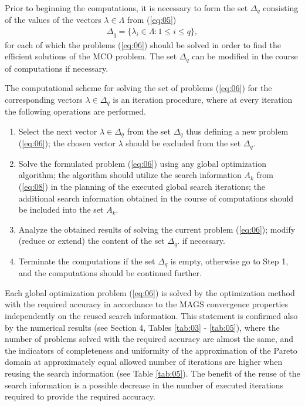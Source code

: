 \documentclass[smallcondensed]{svjour3}     %
\begin{document}
Prior to beginning the computations, it is necessary to form the set $\Delta_q$ consisting of the values of the vectors $\lambda \in \Lambda$ from (\ref{eq:05})
\begin{eqnarray} \label{eq:11}
\Delta_q = \{\lambda_i \in \Lambda: 1 \leq i \leq q\},
\end{eqnarray}
for each of which the problems (\ref{eq:06}) should be solved in order to find the efficient solutions of the MCO problem. The set $\Delta_q$ can be modified in the course of computations if necessary.\par

The computational scheme for solving the set of problems (\ref{eq:06}) for the corresponding vectors $\lambda \in \Delta_q$ is an iteration procedure, where at every iteration the following operations are performed.
\begin{enumerate}
	\item Select the next vector $\lambda \in \Delta_q$ from the set $\Delta_q$ thus defining a new problem (\ref{eq:06}); the chosen vector $\lambda$ should be excluded from the set $\Delta_q$.
	\item Solve the formulated problem (\ref{eq:06}) using any global optimization algorithm; the algorithm should utilize the search information $A_k$ from (\ref{eq:08}) in the planning of the executed global search iterations; the additional search information obtained in the course of computations should be included into the set $A_k$.
	\item Analyze the obtained results of solving the current problem (\ref{eq:06}); modify (reduce or extend) the content of the set $\Delta_q$. if necessary.
	\item Terminate the computations if the set $\Delta_q$ is empty, otherwise go to Step 1, and the computations should be continued further.
\end{enumerate}

Each global optimization problem (\ref{eq:06}) is solved by the optimization method with the required accuracy in accordance to the MAGS convergence properties independently on the reused search information. This statement is confirmed also by the numerical results (see Section 4, Tables \ref{tab:03} - \ref{tab:05}), where the number of problems solved with the required accuracy are almost the same, and the indicators of completeness and uniformity of the approximation of the Pareto domain at approximately equal allowed number of  iterations are higher when reusing the search information (see Table \ref{tab:05}). The benefit of the reuse of the search information is a possible decrease in the number of executed iterations required to provide the required accuracy.\par
\end{document}
